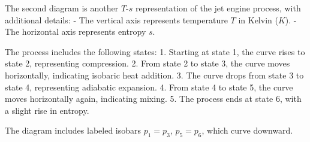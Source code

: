 The second diagram is another \( T \)-\( s \) representation of the jet engine process, with additional details:  
- The vertical axis represents temperature \( T \) in Kelvin (\( K \)).  
- The horizontal axis represents entropy \( s \).  

The process includes the following states:  
1. Starting at state 1, the curve rises to state 2, representing compression.  
2. From state 2 to state 3, the curve moves horizontally, indicating isobaric heat addition.  
3. The curve drops from state 3 to state 4, representing adiabatic expansion.  
4. From state 4 to state 5, the curve moves horizontally again, indicating mixing.  
5. The process ends at state 6, with a slight rise in entropy.  

The diagram includes labeled isobars \( p_1 = p_3 \), \( p_5 = p_6 \), which curve downward.